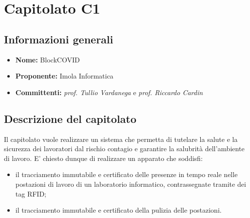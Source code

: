 \section{Capitolato C1}

\subsection{Informazioni generali}
\begin{itemize}
\item \textbf{Nome:} BlockCOVID
\item \textbf{Proponente:} Imola Informatica
\item \textbf{Committenti:} \textit{prof. Tullio Vardanega} e \textit{prof. Riccardo Cardin}
\end{itemize}

\subsection{Descrizione del capitolato}
Il capitolato vuole realizzare un sistema che permetta di tutelare la salute e la sicurezza dei lavoratori dal rischio contagio e garantire la salubrità dell'ambiente di lavoro. E' chiesto dunque di realizzare un apparato che soddisfi:
\begin{itemize}
\item il tracciamento immutabile e certificato delle presenze in tempo reale nelle postazioni di lavoro di un laboratorio informatico, contrassegnate tramite dei tag RFID;
\item il tracciamento immutabile e certificato della pulizia delle postazioni.
\end{itemize}
